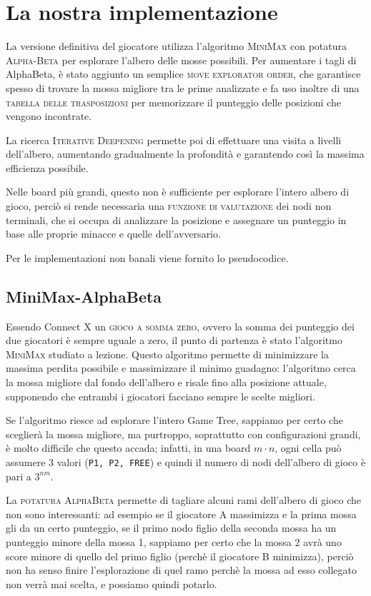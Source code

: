 \documentclass{article}
\begin{document}
\section{La nostra implementazione}

La versione definitiva del giocatore utilizza l'algoritmo \textsc{MiniMax} con 
potatura \textsc{Alpha-Beta} per esplorare l'albero delle mosse possibili.
Per aumentare i tagli di AlphaBeta, è stato aggiunto un semplice \textsc{move explorator
order}, che garantisce spesso di trovare la mossa migliore tra le prime analizzate e
fa uso inoltre di una \textsc{tabella delle trasposizioni} per memorizzare il
punteggio delle posizioni che vengono incontrate. 

La ricerca \textsc{Iterative Deepening}
permette poi di effettuare una visita a livelli dell'albero, aumentando gradualmente
la profondità e garantendo così la massima efficienza possibile.

Nelle board più grandi, questo non è sufficiente per esplorare l'intero albero di gioco,
perciò si rende necessaria una \textsc{funzione di valutazione} dei nodi non terminali, che
si occupa di analizzare la posizione e assegnare un punteggio in base alle proprie 
minacce e quelle dell'avversario.

Per le implementazioni non banali viene fornito lo pseudocodice.

\subsection{MiniMax-AlphaBeta}

Essendo Connect X un \textsc{gioco a somma zero}, ovvero la somma dei punteggio dei due giocatori
è sempre uguale a zero, il punto di partenza è stato l'algoritmo \textsc{MiniMax} studiato a lezione. 
Questo algoritmo permette di minimizzare la massima perdita possibile e massimizzare il minimo 
guadagno: l'algoritmo cerca la mossa migliore dal fondo dell'albero e risale fino alla posizione 
attuale, supponendo che entrambi i giocatori facciano sempre le scelte migliori.

Se l'algoritmo riesce ad esplorare l'intero Game Tree, sappiamo per certo che sceglierà la mossa 
migliore, ma purtroppo, soprattutto con configurazioni grandi, è molto difficile che questo accada; 
infatti, in una board $m \cdot n$, ogni cella può assumere 3 valori (\verb!P1, P2, FREE!) e quindi 
il numero di nodi dell'albero di gioco è pari a $3^{nm}$.

La \textsc{potatura AlphaBeta} permette di tagliare alcuni rami dell'albero di gioco che non sono 
interessanti: ad esempio se il giocatore A massimizza e la prima mossa gli da un certo punteggio, se
il primo nodo figlio della seconda mossa ha un punteggio minore della mossa 1, sappiamo per certo che
la mossa 2 avrà uno score minore di quello del primo figlio (perchè il giocatore B minimizza), 
perciò non ha senso finire l'esplorazione di quel ramo perchè la mossa ad esso collegato non verrà 
mai scelta, e possiamo quindi potarlo.
\end{document}
